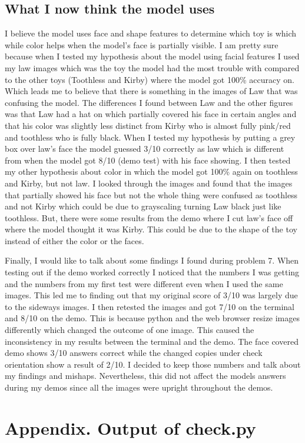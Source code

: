 \documentclass[11pt]{article}
\begin{document}
\subsection*{What I now think the model uses}

I believe the model uses face and shape features to determine which toy is
which while color helps when the model's face is partially visible. I am
pretty sure because when I tested my hypothesis about the model using facial
features I used my law images which was the toy the model had the most trouble
with compared to the other toys (Toothless and Kirby) where the model got
100\% accuracy on. Which leads me to believe that there is something in the
images of Law that was confusing the model. The differences I found between
Law and the other figures was that Law had a hat on which partially covered
his face in certain angles and that his color was slightly less distinct from
Kirby who is almost fully pink/red and toothless who is fully black. When I
tested my hypothesis by putting a grey box over law's face the model guessed
3/10 correctly as law which is different from when the model got 8/10 (demo
test) with his face showing. I then tested my other hypothesis about color in
which the model got 100\% again on toothless and Kirby, but not law. I looked
through the images and found that the images that partially showed his face
but not the whole thing were confused as toothless and not Kirby which could
be due to grayscaling turning Law black just like toothless. But, there were
some results from the demo where I cut law's face off where the model thought
it was Kirby. This could be due to the shape of the toy instead of either the
color or the faces.

Finally, I would like to talk about some findings I found during problem 7.
When testing out if the demo worked correctly I noticed that the numbers I was
getting and the numbers from my first test were different even when I used the
same images. This led me to finding out that my original score of 3/10 was
largely due to the sideways images. I then retested the images and got 7/10 on
the terminal and 8/10 on the demo. This is because python and the web browser
resize images differently which changed the outcome of one image. This caused the inconsistency in my results between the terminal and the demo. The face covered demo shows 3/10 answers correct while the changed copies under check orientation show a result of 2/10.  I decided to
keep those numbers and talk about my findings and mishaps. Nevertheless, this
did not affect the models answers during my demos since all the images were
upright throughout the demos.

\section*{Appendix. Output of check.py}
\end{document}
